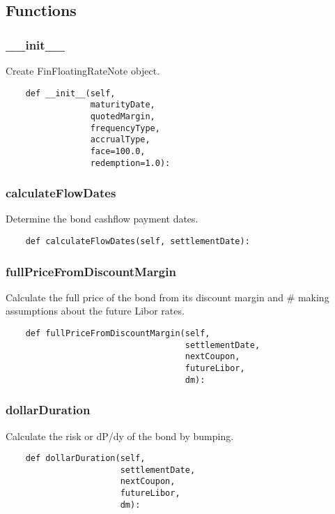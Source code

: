 \documentclass[twoside,11pt]{book}
\begin{document}
\subsection*{Functions}

\subsubsection*{{\bf \_\_init\_\_}}
Create FinFloatingRateNote object.  

\begin{lstlisting}
    def __init__(self,
                 maturityDate,
                 quotedMargin,
                 frequencyType,
                 accrualType,
                 face=100.0,
                 redemption=1.0):
\end{lstlisting}

\subsubsection*{{\bf calculateFlowDates}}
Determine the bond cashflow payment dates.  

\begin{lstlisting}
    def calculateFlowDates(self, settlementDate):
\end{lstlisting}

\subsubsection*{{\bf fullPriceFromDiscountMargin}}
Calculate the full price of the bond from its discount margin and \# making assumptions about the future Libor rates.  

\begin{lstlisting}
    def fullPriceFromDiscountMargin(self,
                                    settlementDate,
                                    nextCoupon,
                                    futureLibor,
                                    dm):
\end{lstlisting}

\subsubsection*{{\bf dollarDuration}}
Calculate the risk or dP/dy of the bond by bumping.  

\begin{lstlisting}
    def dollarDuration(self,
                       settlementDate,
                       nextCoupon,
                       futureLibor,
                       dm):
\end{lstlisting}
\end{document}
